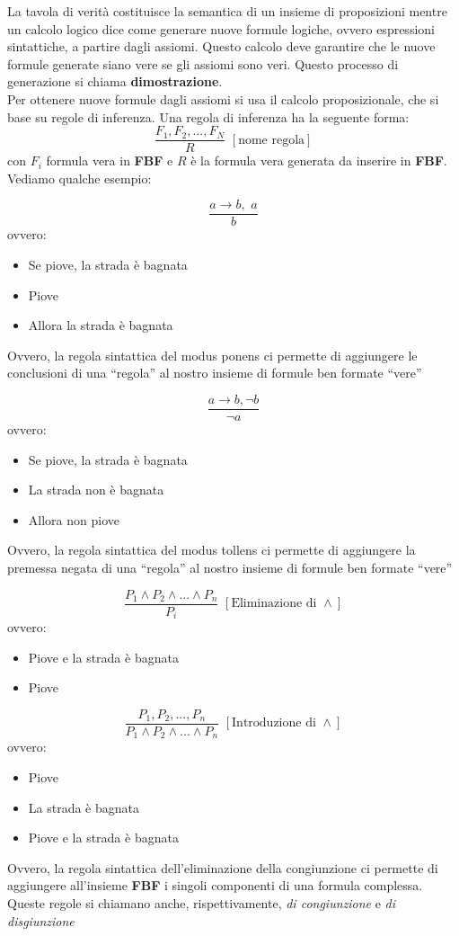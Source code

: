 \documentclass[a4paper,12pt, oneside]{book}
\begin{document}
La tavola di verità costituisce la semantica di un insieme di proposizioni mentre un calcolo logico dice come generare nuove formule logiche, ovvero espressioni sintattiche, a partire dagli assiomi. Questo calcolo deve garantire che le nuove formule generate siano vere se gli assiomi sono veri. Questo processo di generazione si chiama \textbf{dimostrazione}.\\
Per ottenere nuove formule dagli assiomi si usa il calcolo proposizionale, che si base su regole di inferenza. Una regola di inferenza ha la seguente forma:
$$\frac{F_1,F_2,...,F_N}{R}\,\,[\mbox{nome regola}]$$
con $F_i$ formula vera in \textbf{FBF} e $R$ è la formula vera generata da inserire in \textbf{FBF}. Vediamo qualche esempio:
\begin{esempio}
$$\frac{a\to b,\,\,a}{b}$$
ovvero:
\begin{itemize}
\item Se piove, la strada è bagnata
\item Piove
\item Allora la strada è bagnata
\end{itemize}
Ovvero, la regola sintattica del modus ponens ci permette di
aggiungere le conclusioni di una “regola” al nostro insieme di formule ben formate “vere”
\end{esempio}
\begin{esempio}
$$\frac{a\to b, \neg b}{\neg a}$$
ovvero:
\begin{itemize}
\item Se piove, la strada è bagnata
\item La strada non è bagnata
\item Allora non piove
\end{itemize}
Ovvero, la regola sintattica del modus tollens ci permette di
aggiungere la premessa negata di una “regola” al nostro insieme di formule ben formate “vere”
\end{esempio}
\begin{esempio}
$$\frac{P_1\wedge P_2 \wedge ... \wedge P_n}{P_i}\,\,[\mbox{Eliminazione di }\wedge]$$
ovvero:
\begin{itemize}
\item Piove e la strada è bagnata
\item Piove
\end{itemize}
$$\frac{P_1, P_2,...,P_n}{P_1\wedge P_2 \wedge ... \wedge P_n}\,\,[\mbox{Introduzione di }\wedge]$$
ovvero:
\begin{itemize}
\item Piove
\item La strada è bagnata
\item Piove e la strada è bagnata
\end{itemize}
Ovvero, la regola sintattica dell’eliminazione della congiunzione ci permette di aggiungere all’insieme \textbf{FBF} i singoli componenti di una formula complessa. \\
Queste regole si chiamano anche, rispettivamente, \textit{di congiunzione} e \textit{di disgiunzione}
\end{esempio}
\end{document}
